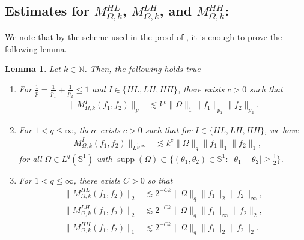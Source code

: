 \documentclass[a4paper,reqno]{amsart}
\newcommand{\N}{{\mathbb N}}
\newcommand{\Sp}{{\mathbb S}}
\newcommand{\supp}[1]{\operatorname{supp}(#1)}   %
\newtheorem{lemma}[theorem]{Lemma}
\theoremstyle{definition}
\numberwithin{equation}{section}
\begin{document}
\subsection*{Estimates for $M^{HL}_{\Omega,k}$, $M^{LH}_{\Omega,k}$, and $M^{HH}_{\Omega,k}$:} We note that by the scheme used in the proof of , it is enough to prove the following lemma.
\begin{lemma}\label{lemma:MOmega}
	Let $k\in\N$. Then, the following holds true
\begin{enumerate}
	\item For $\frac{1}{p}=\frac{1}{p_1}+\frac{1}{p_2}\leq1$ and $I\in\{HL,LH,HH\}$, there exists $c>0$ such that
	\begin{align}\label{est:MOmegagrowth}
		\|M^{I}_{\Omega,k}(f_1,f_2)\|_p&\lesssim k^c\|\Omega\|_1\|f_1\|_{p_1}\|f_2\|_{p_2}.
	\end{align}
	\item For $1< q\leq\infty$, there exists $c>0$ such that for $I\in\{HL,LH,HH\}$, we have
	\begin{align}\label{est:MOmegaendpoint}
		\|M_{\Omega,k}^{I}(f_1,f_2)\|_{L^{\frac{1}{2},\infty}}&\lesssim k^c\|\Omega\|_q\|f_1\|_{1}\|f_2\|_{1},
	\end{align} 
	for all $\Omega\in L^q(\Sp^1)$ with $\supp{\Omega}\subset\{(\theta_1,\theta_2)\in\Sp^1:\;|\theta_1-\theta_2|\geq\frac{1}{2}\}$.
	\item For $1<q\leq\infty$, there exists $C>0$ so that 
	\begin{equation}\label{est:MOmegadecay}
		\begin{aligned}
			\|M^{HL}_{\Omega,k}(f_1,f_2)\|_2&\lesssim 2^{-Ck}\|\Omega\|_q\|f_1\|_2\|f_2\|_\infty,\\
			\|M^{LH}_{\Omega,k}(f_1,f_2)\|_2&\lesssim 2^{-Ck}\|\Omega\|_q\|f_1\|_\infty\|f_2\|_2,\\
			\|M^{HH}_{\Omega,k}(f_1,f_2)\|_1&\lesssim 2^{-Ck}\|\Omega\|_q\|f_1\|_2\|f_2\|_2.
		\end{aligned}
	\end{equation}
\end{enumerate}
\end{lemma}
\end{document}
